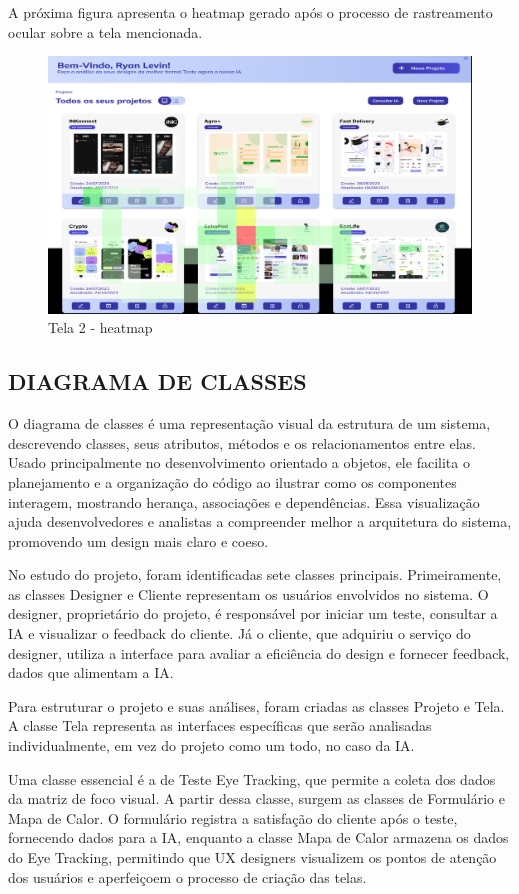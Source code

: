 A próxima figura apresenta o heatmap gerado após o processo de rastreamento ocular sobre a tela mencionada.

\begin{figure}[H]
    \centering
    \caption{Tela 2 - heatmap}%
    \label{fig:pg-telaPython2}
    \includegraphics[width=0.72\linewidth]{Illustrations/python2.png}
\end{figure}

\subsection*{DIAGRAMA DE CLASSES}
O diagrama de classes é uma representação visual da estrutura de um sistema, descrevendo classes, seus atributos, métodos e os relacionamentos entre elas. Usado principalmente no desenvolvimento orientado a objetos, ele facilita o planejamento e a organização do código ao ilustrar como os componentes interagem, mostrando herança, associações e dependências. Essa visualização ajuda desenvolvedores e analistas a compreender melhor a arquitetura do sistema, promovendo um design mais claro e coeso. \textcite{Lucidchart}

No estudo do projeto, foram identificadas sete classes principais. Primeiramente, as classes Designer e Cliente representam os usuários envolvidos no sistema. O designer, proprietário do projeto, é responsável por iniciar um teste, consultar a IA e visualizar o feedback do cliente. Já o cliente, que adquiriu o serviço do designer, utiliza a interface para avaliar a eficiência do design e fornecer feedback, dados que alimentam a IA.

Para estruturar o projeto e suas análises, foram criadas as classes Projeto e Tela. A classe Tela representa as interfaces específicas que serão analisadas individualmente, em vez do projeto como um todo, no caso da IA.

Uma classe essencial é a de Teste Eye Tracking, que permite a coleta dos dados da matriz de foco visual. A partir dessa classe, surgem as classes de Formulário e Mapa de Calor. O formulário registra a satisfação do cliente após o teste, fornecendo dados para a IA, enquanto a classe Mapa de Calor armazena os dados do Eye Tracking, permitindo que UX designers visualizem os pontos de atenção dos usuários e aperfeiçoem o processo de criação das telas.\newline

